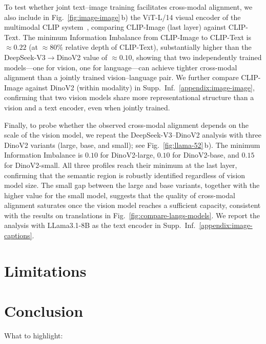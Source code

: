 \documentclass[10pt]{article} %
\begin{document}
To test whether joint text--image training facilitates cross-modal alignment, we also include in Fig.~\ref{fig:image-image}\,b) the ViT-L/14 visual encoder of the multimodal CLIP system~\citep{radford2021learning}, comparing CLIP-Image (last layer) against CLIP-Text.
The minimum Information Imbalance from CLIP-Image to CLIP-Text is $\approx 0.22$ (at $\approx 80\%$ relative depth of CLIP-Text), substantially higher than the DeepSeek-V3$\to$DinoV2 value of $\approx 0.10$, showing that two independently trained models---one for vision, one for language---can achieve tighter cross-modal alignment than a jointly trained vision--language pair.
We further compare CLIP-Image against DinoV2 (within modality) in Supp.~Inf.~\ref{appendix:image-image}, confirming that two vision models share more representational structure than a vision and a text encoder, even when jointly trained.

Finally, to probe whether the observed cross-modal alignment depends on the scale of the vision model, we repeat the DeepSeek-V3--DinoV2 analysis with three DinoV2 variants (large, base, and small); see Fig.~\ref{fig:llama-52}\,b).
The minimum Information Imbalance is $0.10$ for DinoV2-large, $0.10$ for DinoV2-base, and $0.15$ for DinoV2-small.
All three profiles reach their minimum at the last layer, confirming that the semantic region is robustly identified regardless of vision model size.
The small gap between the large and base variants, together with the higher value for the small model, suggests that the quality of cross-modal alignment saturates once the vision model reaches a sufficient capacity, consistent with the results on translations in Fig.~\ref{fig:compare-langs-models}.
We report the analysis with LLama3.1-8B as the text encoder in Supp.~Inf.~\ref{appendix:image-captions}.


\section{Limitations}
\label{sec:limitations}

\section{Conclusion}
\label{sec:conclusions}

What to highlight:
\end{document}
